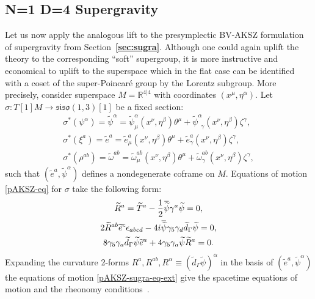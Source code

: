 \documentclass[a4paper,12pt]{article}
\numberwithin{equation}{section} %
\renewcommand{\tilde}{\widetilde}
\newcommand{\bref}[1]{\textbf{\ref{#1}}}
\numberwithin{equation}{section}
\newcommand{\overbar}[1]{\mkern 1.5mu\overline{\mkern-1.5mu#1\mkern-1.5mu}\mkern 1.5mu}
\newcommand{\atheta}{\theta}
\newcommand{\stheta}{\eta}
\newcommand{\astheta}{\zeta}
\begin{document}
\subsection{N=1 D=4 Supergravity}

Let us now apply the analogous lift to the presymplectic BV-AKSZ formulation of supergravity from Section~\bref{sec:sugra}. Although one could again uplift the theory to the corresponding ``soft'' supergroup, it is more instructive and economical to uplift to the superspace which in the flat case can be identified with   a coset of the super-Poincar\'e group by the Lorentz subgroup. More precisely, consider superspace $M = \mathbb{R}^{4|4}$ with coordinates $(x^\mu, \stheta^\alpha)$. Let $\sigma: T[1]M \to \mathfrak{siso(1,3)}[1]$ be a fixed section: 
\begin{equation}
\begin{gathered}
    \sigma^\ast(\psi^\alpha) = \tilde{\psi}^\alpha = \tilde{\psi}^\alpha_\mu (x^\nu, \stheta^\beta) \atheta^\mu +  \tilde{\psi}^\alpha_{\enspace\gamma} (x^\nu, \stheta^\beta)\astheta^\gamma,\\
    \sigma^\ast(\xi^a) =\tilde{e}^a= \tilde{e}^a_\mu (x^\nu, \stheta^\beta) \atheta^\mu +  \tilde{e}^a_\gamma (x^\nu, \stheta^\beta)\astheta^\gamma,\\
    \sigma^\ast(\rho^{ab}) = \tilde{\omega}^{ab} = \tilde{\omega}^{ab}_\mu (x^\nu, \stheta^\beta) \atheta^\mu +  \tilde{\omega}^{ab}_\gamma (x^\nu, \stheta^\beta)\astheta^\gamma,
\end{gathered}
\end{equation}
such that $(\tilde{e}^a,\tilde{\psi}^\alpha)$ defines a nondegenerate coframe on $M$. Equations of motion \eqref{pAKSZ-eq} for $\sigma$ take the following form:
\begin{equation}\label{pAKSZ-sugra-eq-ext}
\begin{gathered}
    \tilde{R}^a =  \tilde{T}^a - \frac{1}{2} \overbar{\tilde{\psi}} \gamma^a \tilde{\psi} = 0,\\
   2\tilde{R}^{ab} \tilde{e}^c \epsilon_{abcd} - 4i\overbar{\tilde{\psi}} \gamma_5\gamma_d \tilde d_\Gamma \tilde{\psi} = 0,\\
    8\gamma_5 \gamma_a \tilde d_\Gamma \tilde{\psi} \tilde{e}^a + 4\gamma_5 \gamma_a \tilde{\psi} \tilde{R}^a = 0.
\end{gathered}
\end{equation}
Expanding the curvature 2-forms $R^a,R^{ab},R^\alpha\equiv (\tilde d_\Gamma\tilde \psi)^\alpha$ in the basis of  $(\tilde{e}^a,\tilde{\psi}^\alpha)$ the equations of motion \eqref{pAKSZ-sugra-eq-ext} give the spacetime equations of motion and the rheonomy conditions~\cite{Castellani:1991eu}.
\end{document}

